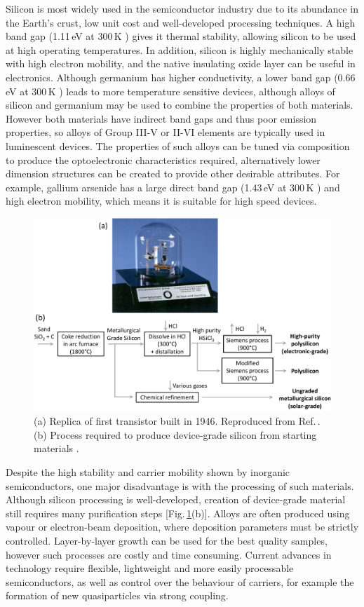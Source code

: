 Silicon is most widely used in the semiconductor industry due to its abundance in the Earth's crust, low unit cost and well-developed processing techniques. A high band gap (1.11\,eV at 300\,K \cite{Kittel1986}) gives it thermal stability, allowing silicon to be used at high operating temperatures. In addition, silicon is highly mechanically stable with high electron mobility, and the native insulating oxide layer can be useful in electronics. Although germanium has higher conductivity, a lower band gap (0.66\,eV at 300\,K \cite{Kittel1986}) leads to more temperature sensitive devices, although alloys of silicon and germanium may be used to combine the properties of both materials. However both materials have indirect band gaps and thus poor emission properties, so alloys of Group III-V or II-VI elements are typically used in luminescent devices. The properties of such alloys can be tuned via composition to produce the optoelectronic characteristics required, alternatively lower dimension structures can be created to provide other desirable attributes. For example, gallium arsenide has a large direct band gap (1.43\,eV at 300\,K \cite{Kittel1986}) and high electron mobility, which means it is suitable for high speed devices.
\begin{figure}[h!]
\centering
\includegraphics[width=\textwidth]{Fig1}
\caption{(a) Replica of first transistor built in 1946. Reproduced from Ref.\,\cite{Transistor}. (b) Process required to produce device-grade silicon from starting materials \cite{Silicon}.}
\label{1Fig1}
\end{figure}

Despite the high stability and carrier mobility shown by inorganic semiconductors, one major disadvantage is with the processing of such materials. Although silicon processing is well-developed, creation of device-grade material still requires many purification steps [Fig.\,\ref{1Fig1}(b)]. Alloys are often produced using vapour or electron-beam deposition, where deposition parameters must be strictly controlled. Layer-by-layer growth can be used for the best quality samples, however such processes are costly and time consuming. Current advances in technology require flexible, lightweight and more easily processable semiconductors, as well as control over the behaviour of carriers, for example the formation of new quasiparticles via strong coupling.

